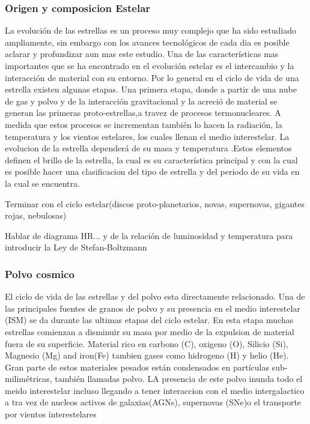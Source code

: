 \documentclass[12pt]{article}
\begin{document}
\subsubsection{Origen y composicion Estelar}
La evolución de las estrellas es un proceso muy complejo que ha sido estudiado ampliamente, sin embargo con los avances tecnológicos de cada dia es posible aclarar y profundizar aun mas este estudio. 
Una de las características mas importantes que se ha encontrado en el evolución estelar es el intercambio y la interacción de material con su entorno. Por lo general en el ciclo de vida de una estrella 
existen algunas etapas. Una primera etapa, donde a partir de una nube de gas y polvo  y de la interacción gravitacional y la acreció de material se generan las primeras proto-estrellas,a travez de procesos 
termonucleares. A medida que estos procesos se incrementan también lo hacen la radiación, la temperatura y  los vientos estelares, los cuales llenan el medio interestelar. La evolucion de la estrella 
dependerá de su masa y temperatura \cite{Whittet2022DustIT}.Estos elementos definen el brillo de la estrella, la cual es su característica principal y con la cual es posible hacer una clasificacion del tipo de estrella y del periodo 
de su vida en la cual se encuentra. 

Terminar con el ciclo estelar(discos proto-planetarios, novas, supernovas, gigantes rojas, nebulosas)

Hablar de diagrama HR... y de la relación de luminosidad y temperatura para introducir la Ley de Stefan-Boltzmann

\subsubsection{Polvo cosmico}
El ciclo de vida de las estrellas y del polvo esta directamente relacionado. Una de las principales fuentes de granos de polvo y su presencia en el medio interestelar (ISM) se da durante las ultimas etapas 
del ciclo estelar. En esta etapa muchas estrellas comienzan a disminuir su masa por medio de la expulsion de material fuera de su superficie. Material rico en carbono (C), oxigeno (O), Silicio (Si), Magnesio (Mg) 
and iron(Fe) tambien gases como hidrogeno (H) y helio (He). Gran parte de estos materiales pesados están condensados en partículas sub-milimétricas, también llamadas polvo. LA presencia de este polvo inunda todo 
el meido interestelar incluso llegando a tener interaccion con el medio intergalactico a tra vez de nucleos activos de galaxias(AGNs), supernovas (SNe)o el transporte por vientos  interestelares \cite{mathis1977size}
\end{document}
